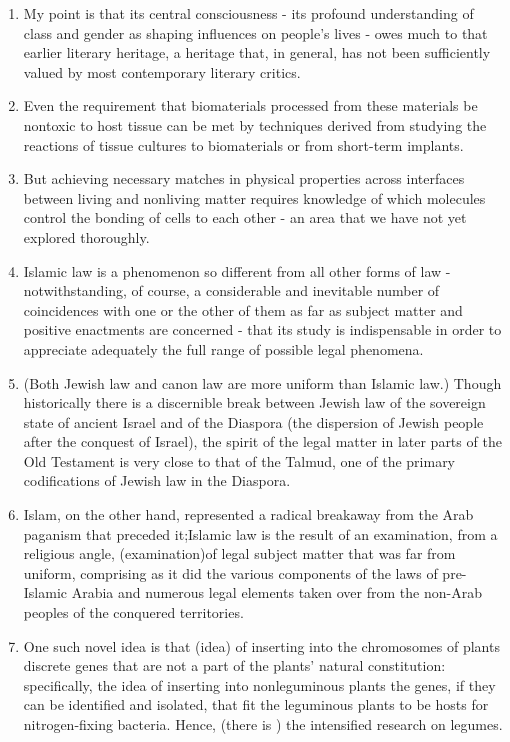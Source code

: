\begin{enumerate}
\item My point is that its central consciousness - its profound understanding of class and gender  as shaping influences on people's lives - owes much to that earlier literary heritage, a heritage that, in general, has not been sufficiently valued by most contemporary literary critics.

\item Even the requirement that biomaterials processed from these materials be nontoxic to host tissue can be met by techniques derived from studying the reactions of tissue cultures to biomaterials or from short-term implants.

\item But achieving necessary matches in physical properties across interfaces between living and  nonliving matter requires knowledge of which molecules control the bonding of cells to each other - an area that we have not yet explored thoroughly. 

\item Islamic law is a phenomenon so different from all other forms of law -  notwithstanding, of course, a considerable and inevitable number of coincidences with one or the other of them as far as subject matter and positive enactments are concerned - that its study is indispensable in order to appreciate adequately the full range of possible legal phenomena. 

\item (Both Jewish law and canon law are more uniform than Islamic law.) Though historically there is a discernible break between Jewish law of the sovereign state of ancient Israel and of the Diaspora (the dispersion of Jewish people after the conquest of Israel),  the spirit of the legal matter in later parts of the Old Testament is very close to that of the Talmud,  one of the primary codifications of Jewish law in the Diaspora. 

\item Islam, on the other hand, represented a radical breakaway from the Arab paganism that preceded it;Islamic law is the result of an examination,  from a religious angle, (examination)of legal subject matter that was far from uniform, comprising as it did the various components of the laws of pre-Islamic Arabia and numerous legal elements taken over from the non-Arab peoples of the conquered territories. 

\item One such novel idea is that (idea) of inserting into the chromosomes of plants discrete genes that are not a part of the plants' natural constitution:  specifically, the idea of inserting into  nonleguminous plants the genes, if they can be identified and isolated, that fit the leguminous plants to be hosts for nitrogen-fixing bacteria. Hence, (there is ) the intensified research on legumes. 


\end{enumerate}
